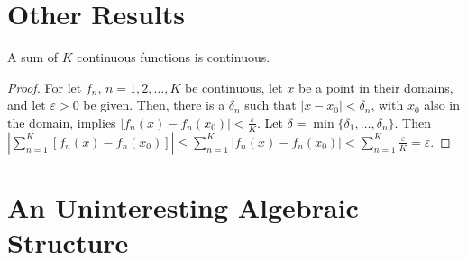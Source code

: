 \documentclass[crop=false,class=book]{standalone}
\begin{document}
\section{Other Results}
\begin{theorem}
A sum of $K$ continuous functions is continuous. 
\end{theorem}
\begin{proof}
For let $f_n$, $n=1,2,\hdots,K$ be continuous, let $x$ be a point in their domains, and let $\varepsilon>0$ be given. Then, there is a $\delta_n$ such that $|x-x_0|<\delta_n$, with $x_0$ also in the domain, implies $|f_n(x)-f_n(x_0)|<\frac{\varepsilon}{K}$. Let $\delta = \min\{\delta_1,\hdots,\delta_n\}$. Then $|\sum_{n=1}^{K}[f_n(x)-f_n(x_0)]| \leq \sum_{n=1}^{K}|f_n(x)-f_n(x_0)| < \sum_{n=1}^{K} \frac{\varepsilon}{K} = \varepsilon$.
\end{proof}
\section{An Uninteresting Algebraic Structure}
\end{document}
